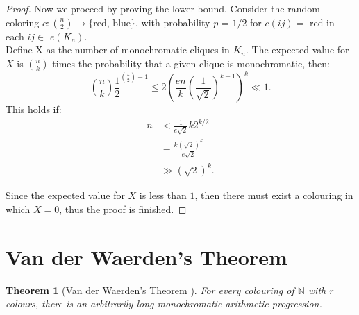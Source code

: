 \documentclass[12pt,twoside,a4paper]{book}
\numberwithin{equation}{section}
\newtheorem{theorem}             {Theorem}[section]
\theoremstyle{remark}
\begin{document}
\begin{proof}
Now we proceed by proving the lower bound. Consider the random coloring $c\colon \binom{n}{2} \rightarrow \{$red, blue$\}$, with probability $p$ = $1/2$ for  $c(ij) =$ red in each $ij \in$ $e(K_n)$.\\ 
Define X as the number of monochromatic cliques in $K_n$. The expected value for $X$ is $\binom{n}{k}$ times the probability that a given clique is monochromatic, then:
$$\binom{n}{k}\frac{1}{2} ^{\binom{k}{2}-1} \leq 2 \left( \frac{en}{k} \left( \frac{1}{\sqrt{2}} \right)^{k-1} \right)^{k} \ll 1.$$ 
This holds if: 
\begin{align*}
n &<\frac{1}{e\sqrt{2}}k2^{k/2} \\
& = \frac{k(\sqrt{2})^{k}}{e\sqrt{2}}\\
& \gg (\sqrt{2})^k.
\end{align*}

Since the expected value for $X$ is less than $1$, then there must exist a colouring in which $X=0$, thus the proof is finished.
\end{proof}

\section{Van der Waerden's Theorem}

\begin{theorem}[{Van der Waerden's Theorem \cite{Van27}}] %
 For every colouring of  $\mathbb{N}$ with $r$ colours, there is an arbitrarily long monochromatic arithmetic progression. 
\end{theorem}
\end{document}
